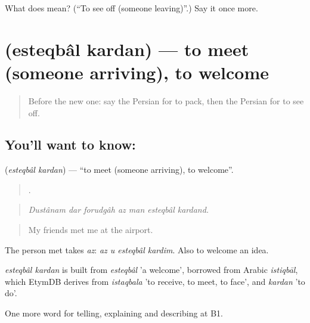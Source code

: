 \begin{tcolorbox}[breakable,colback=teal!4,colframe=teal!35!black,title={Before you move on}]
What does   mean? (\textquotedblleft{}To see off (someone leaving)\textquotedblright{}.) Say it once more.
\end{tcolorbox}
\section[\texorpdfstring{\fa{استقبال} \fa{کردن} (esteqbâl kardan)}{استقبال کردن (esteqbâl kardan)}]{  (esteqbâl kardan) — to meet (someone arriving), to welcome}

\label{lesson:FA-C433-esteqbal-kardan}



\begin{quote}
Before the new one: say the Persian for to pack, then the Persian for to see off.
\end{quote}

\subsection*{You'll want to know:  }
\textbf{ } (\emph{esteqbâl kardan}) — \textquotedblleft{}to meet (someone arriving), to welcome\textquotedblright{}.

\begin{quote}
      .
\end{quote}

\begin{quote}
\emph{Dustânam dar forudgâh az man esteqbâl kardand.}
\end{quote}

\begin{quote}
My friends met me at the airport.
\end{quote}

The person met takes \emph{az}: \emph{az u esteqbâl kardim}. Also to welcome an idea.

\begin{cousinweb}
\emph{esteqbâl kardan} is built from \emph{esteqbâl} 'a welcome', borrowed from Arabic \emph{istiqbāl}, which EtymDB derives from \emph{istaqbala} 'to receive, to meet, to face', and \emph{kardan} 'to do'.
\end{cousinweb}

\begin{grammarlens}[title={What you've built}]
One more word for telling, explaining and describing at B1.
\end{grammarlens}

